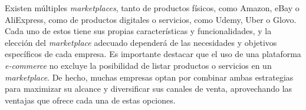 Existen múltiples \textit{marketplaces}, tanto de productos físicos, como Amazon, eBay o AliExpress, como de productos digitales o servicios, como Udemy, Uber o Glovo. Cada uno de estos tiene sus propias características y funcionalidades, y la elección del \textit{marketplace} adecuado dependerá de las necesidades y objetivos específicos de cada empresa. Es importante destacar que el uso de una plataforma \textit{e-commerce} no excluye la posibilidad de listar productos o servicios en un \textit{marketplace}. De hecho, muchas empresas optan por combinar ambas estrategias para maximizar su alcance y diversificar sus canales de venta, aprovechando las ventajas que ofrece cada una de estas opciones. \cite{sharetribe_marketplac_platforms}